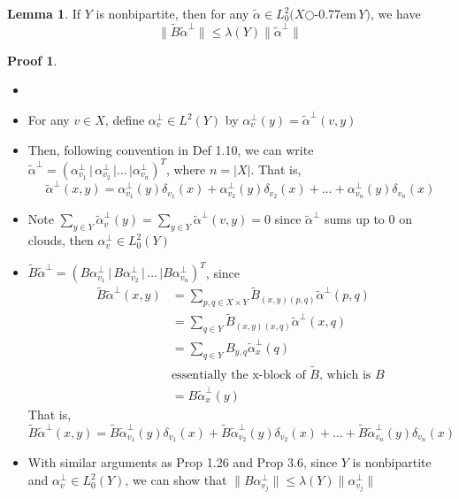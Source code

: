 \documentclass{book}
\newcommand{\zigzag}{$\bigcirc$\kern-0.77em\raisebox{-.16ex}{\small Z}$\,$}
\newcommand{\norm}[1]{\lVert #1 \rVert}
\newcommand{\abs}[1]{\lvert #1 \rvert }
\theoremstyle{definition}
\newtheorem{lemma}{Lemma}[chapter]
\theoremstyle{remarkstyle}
\newtheorem*{myproof}{Proof}%
\begin{document}
\begin{lemma}
    If $Y$ is nonbipartite, then for any $\tilde{\alpha}\in L^{2}_{0}(X$\zigzag$Y)$, we have 
    $$
    \norm{\tilde{B}\tilde{\alpha}^{\perp}} \le \lambda(Y)\norm{\tilde{\alpha}^{\perp}}
    $$
\end{lemma}
\begin{myproof}
    \begin{itemize}
        \item[]
        \item For any $v\in X$, define $\alpha^{\perp}_v\in L^2(Y) $ by $\alpha^{\perp}_v(y)=\tilde{\alpha}^{\perp}(v,y) $
        \item Then, following convention in Def 1.10, we can write $\tilde{\alpha}^{\perp}=(\alpha^{\perp}_{v_1}\,\lvert\,\alpha^{\perp}_{v_2}\,\lvert\dots\,\lvert\alpha^{\perp}_{v_n})^{T}$, where $n=\abs{X}$. That is, 
        $$
        \tilde{\alpha}^{\perp}(x,y) = \alpha^{\perp}_{v_1}(y)\delta_{v_1}(x) + \alpha^{\perp}_{v_2}(y)\delta_{v_2}(x) + \dots + \alpha^{\perp}_{v_n}(y)\delta_{v_n}(x)
        $$
        \item Note $\sum_{y\in Y}\tilde{\alpha}^{\perp}_v(y) = \sum_{y\in Y}\tilde{\alpha}^{\perp}(v,y) = 0  $ since $\tilde{\alpha}^{\perp}$ sums up to 0 on clouds, then $\alpha^{\perp}_v\in L^2_0(Y) $
        \item $\tilde{B}\tilde{\alpha}^{\perp}=(B\alpha^{\perp}_{v_1}\,\lvert\,B\alpha^{\perp}_{v_2}\,\lvert\,\dots\,\lvert B\alpha^{\perp}_{v_n})^{T} $, since 
        \begin{align*}
            \tilde{B}\tilde{\alpha}^{\perp}(x,y) 
            &= \sum_{p,q\in X\times Y}\tilde{B}_{(x,y)(p,q)}\tilde{\alpha}^{\perp}(p,q) \\
            &= \sum_{q\in Y}\tilde{B}_{(x,y)(x,q)}\tilde{\alpha}^{\perp}(x,q)\\
            &= \sum_{q\in Y}B_{y,q}\tilde{\alpha}^{\perp}_{x}(q) \\
            &\textrm{essentially the x-block of $\tilde{B}$, which is $B$} \\
            &= B\tilde{\alpha}^{\perp}_{x}(y)
        \end{align*}
        That is, 
        $$
        \tilde{B}\tilde{\alpha}^{\perp}(x,y)=\tilde{B}\tilde{\alpha}^{\perp}_{v_1}(y)\delta_{v_1}(x) + \tilde{B}\tilde{\alpha}^{\perp}_{v_2}(y)\delta_{v_2}(x) + \dots + \tilde{B}\tilde{\alpha}^{\perp}_{v_n}(y)\delta_{v_n}(x)
        $$
        \item With similar arguments as Prop 1.26 and Prop 3.6, since $Y$ is nonbipartite and $\alpha^{\perp}_v\in L^2_0(Y) $, we can show that $\norm{B\alpha^{\perp}_{v_j} }\le \lambda(Y)\norm{\alpha^{\perp}_{v_j}} $

\end{itemize}
\end{myproof}
\end{document}
